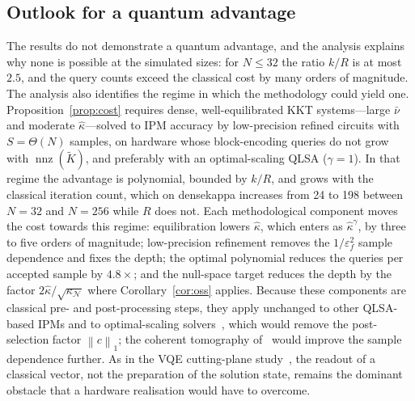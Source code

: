 \documentclass[11pt]{article}
\theoremstyle{definition}
\newcommand{\norm}[1]{\left\lVert #1 \right\rVert}
\newcommand{\Kt}{\tilde K}
\newcommand{\kh}{\hat\kappa}
\newcommand{\eps}{\varepsilon}
\newcommand{\nnz}{\operatorname{nnz}}
\newcommand{\dsus}{\textunderscore\penalty5000\hskip0pt\relax}
\newcommand{\ds}[1]{{\ttfamily\let\_\dsus#1}}
\begin{document}
\subsection{Outlook for a quantum advantage}
The results do not demonstrate a quantum advantage, and the analysis explains why none is possible at the simulated sizes: for $N\le32$ the ratio $k/R$ is at most $2.5$, and the query counts exceed the classical cost by many orders of magnitude. The analysis also identifies the regime in which the methodology could yield one. Proposition~\ref{prop:cost} requires dense, well-equilibrated KKT systems---large $\bar\nu$ and moderate $\kh$---solved to IPM accuracy by low-precision refined circuits with $S=\Theta(N)$ samples, on hardware whose block-encoding queries do not grow with $\nnz(\Kt)$, and preferably with an optimal-scaling QLSA ($\gamma=1$). In that regime the advantage is polynomial, bounded by $k/R$, and grows with the classical iteration count, which on \ds{dense\_kappa} increases from 24 to 198 between $N=32$ and $N=256$ while $R$ does not. Each methodological component moves the cost towards this regime: equilibration lowers $\kh$, which enters as $\kh^{\gamma}$, by three to five orders of magnitude; low-precision refinement removes the $1/\eps_f^2$ sample dependence and fixes the depth; the optimal polynomial reduces the queries per accepted sample by $4.8\times$; and the null-space target reduces the depth by the factor $2\kh/\sqrt{\kappa_{\mathcal N}}$ where Corollary~\ref{cor:oss} applies. Because these components are classical pre- and post-processing steps, they apply unchanged to other QLSA-based IPMs and to optimal-scaling solvers~\cite{costa2022optimal,dalzell2024shortcut}, which would remove the post-selection factor $\norm{c}_1$; the coherent tomography of~\cite{vanapeldoorn2023tomography} would improve the sample dependence further. As in the VQE cutting-plane study~\cite{ozbaygin2026vqe}, the readout of a classical vector, not the preparation of the solution state, remains the dominant obstacle that a hardware realisation would have to overcome.
\end{document}
